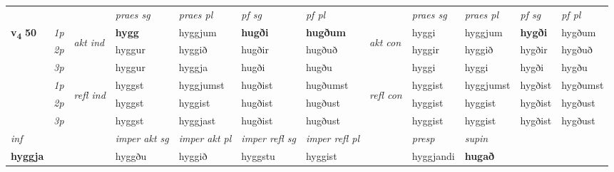 \begin{longtable}[l]{X>{\footnotesize\itshape}llXXXXlXXXX}
 & &   & \textit{praes sg}  & \textit{praes pl}    & \textit{ pf sg} & \textit{pf pl} & & \textit{praes sg}  & \textit{praes pl}    & \textit{pf sg} & \textit{pf pl }  \\ \cmidrule{4-7} \cmidrule{9-12}
 \multirow{2}{*}{{{\textbf{v{\textsubscript{4}}} \Large{\textbf{50}}}}}  & 1p & \multirow{3}{*}{\begin{turn}{90}\textit{akt ind}\end{turn}} & \textbf{hygg} & hyggjum & \textbf{hugði} & \textbf{hugðum} & \multirow{3}{*}{\begin{turn}{90}\textit{akt con}\end{turn}} &hyggi & hyggjum & \textbf{hygði} & hygðum\\*
 & 2p &  &  hyggur  & hyggið & hugðir & hugðuð & & hyggir & hyggið & hygðir & hygðuð \\*
 & 3p &  & hyggur & hyggja & hugði & hugðu & & hyggi & hyggi& hygði & hygðu \\*
\cmidrule{4-7} \cmidrule{9-12}
 & 1p & \multirow{3}{*}{\begin{turn}{90}\textit{refl ind}\end{turn}}  & hyggst & hyggjumst & hugðist & hugðumst & \multirow{3}{*}{\begin{turn}{90}\textit{refl con}\end{turn}}  &hyggist & hyggjumst & hygðist & hygðumst \\*
 & 2p &  & hyggst & hyggist & hugðist & hugðust & &hyggist & hyggist & hygðist & hygðust \\*
 & 3p  & & hyggst & hyggjast & hugðist & hugðust & & hyggist & hyggist& hygðist & hygðust \\*
\cmidrule{4-7} \cmidrule{9-12}

   {\textit{inf}} & &  & \textit{imper akt sg} & \textit{imper akt pl} & \textit{imper refl sg} & \textit{imper refl pl} && \textit{presp} & \textit{supin}   \\*
  {\textbf{hyggja}} & && hyggðu  & hyggið & hyggstu & hyggist && hyggjandi &  \textbf{hugað}   \\*

\midrule


\end{longtable}
